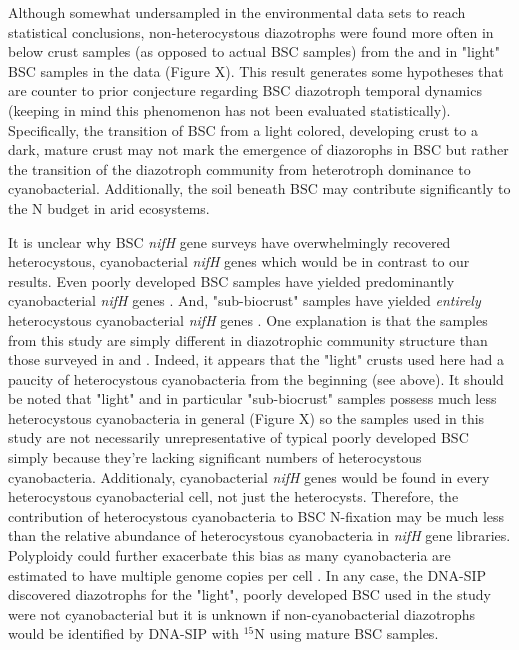 Although somewhat undersampled in the environmental data sets to reach statistical conclusions, non-heterocystous diazotrophs were found more often in below crust samples (as opposed to actual BSC samples) from the \citet{Steven_2013} and in "light" BSC samples in the \citet{Garcia_Pichel_2013} data (Figure X). This result generates some hypotheses that are counter to prior conjecture regarding BSC diazotroph temporal dynamics (keeping in mind this phenomenon has not been evaluated statistically). Specifically, the transition of BSC from a light colored, developing crust to a dark, mature crust may not mark the emergence of diazorophs in BSC but rather the transition of the diazotroph community from heterotroph dominance to cyanobacterial. Additionally, the soil beneath BSC may contribute significantly to the N budget in arid ecosystems.

It is unclear why BSC \textit{nifH} gene surveys have overwhelmingly recovered heterocystous, cyanobacterial \textit{nifH} genes which would be in contrast to our results. Even poorly developed BSC samples have yielded predominantly cyanobacterial \textit{nifH} genes \cite{14766579}. And, "sub-biocrust" samples have yielded \textit{entirely} heterocystous cyanobacterial \textit{nifH} genes \cite{Yeager_2012}. One explanation is that the samples from this study are simply different in diazotrophic community structure than those surveyed in \citet{Yeager} \citet{14766579} and \citet{Yeager_2012}. Indeed, it appears that the "light" crusts used here had a paucity of heterocystous cyanobacteria from the beginning (see above). It should be noted that "light" and in particular "sub-biocrust" samples possess much less heterocystous cyanobacteria in general (Figure X) so the samples used in this study are not necessarily unrepresentative of typical poorly developed BSC simply because they're lacking significant numbers of heterocystous cyanobacteria. Additionaly, cyanobacterial \textit{nifH} genes would be found in every heterocystous cyanobacterial cell, not just the heterocysts. Therefore, the contribution of heterocystous cyanobacteria to BSC N-fixation may be much less than the relative abundance of heterocystous cyanobacteria in \textit{nifH} gene libraries. Polyploidy could further exacerbate this bias as many cyanobacteria are estimated to have multiple genome copies per cell \cite{Griese_2011}. In any case, the DNA-SIP discovered diazotrophs for the "light", poorly developed BSC used in the study were not cyanobacterial but it is unknown if non-cyanobacterial diazotrophs would be identified by DNA-SIP with $^{15}$N using mature BSC samples. 

